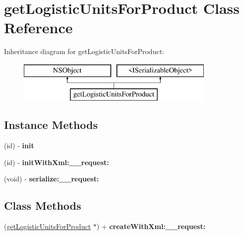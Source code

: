 \hypertarget{interfaceget_logistic_units_for_product}{}\section{get\+Logistic\+Units\+For\+Product Class Reference}
\label{interfaceget_logistic_units_for_product}
Inheritance diagram for get\+Logistic\+Units\+For\+Product\+:\begin{figure}[H]
\begin{center}
\leavevmode
\includegraphics[height=2.000000cm]{interfaceget_logistic_units_for_product}
\end{center}
\end{figure}
\subsection*{Instance Methods}
\begin{DoxyCompactItemize}
\item 
\hypertarget{interfaceget_logistic_units_for_product_aece9c400dd48049f1b4309785dc48fb4}{}(id) -\/ {\bfseries init}\label{interfaceget_logistic_units_for_product_aece9c400dd48049f1b4309785dc48fb4}

\item 
\hypertarget{interfaceget_logistic_units_for_product_ac06178b4dded8f92e0dcbc04ec332c8a}{}(id) -\/ {\bfseries init\+With\+Xml\+:\+\_\+\+\_\+request\+:}\label{interfaceget_logistic_units_for_product_ac06178b4dded8f92e0dcbc04ec332c8a}

\item 
\hypertarget{interfaceget_logistic_units_for_product_a04fa54dd7434a6139e10e040183c6ffd}{}(void) -\/ {\bfseries serialize\+:\+\_\+\+\_\+request\+:}\label{interfaceget_logistic_units_for_product_a04fa54dd7434a6139e10e040183c6ffd}

\end{DoxyCompactItemize}
\subsection*{Class Methods}
\begin{DoxyCompactItemize}
\item 
\hypertarget{interfaceget_logistic_units_for_product_a9e031eb3ee60cf0a03d4c43deef67a66}{}(\hyperlink{interfaceget_logistic_units_for_product}{get\+Logistic\+Units\+For\+Product} $\ast$) + {\bfseries create\+With\+Xml\+:\+\_\+\+\_\+request\+:}\label{interfaceget_logistic_units_for_product_a9e031eb3ee60cf0a03d4c43deef67a66}

\end{DoxyCompactItemize}
